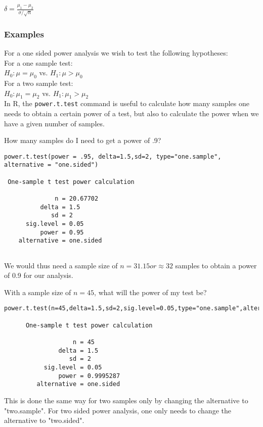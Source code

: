\documentclass[12pt,a4paper]{article}
\theoremstyle{regla}
\theoremstyle{remark}
\theoremstyle{definition}
\theoremstyle{nonumberbreak}
\begin{document}
$\delta = \frac{\mu_1-\mu_2}{\sigma/\sqrt{n}}$
\subsubsection{Examples}
\begin{xmpl}
For a one sided power analysis we wish to test the following hypotheses:\\

For a one sample test:\\
$H_0: \mu = \mu_0$ vs. $H_1: \mu > \mu_0$\\

For a two sample test:\\
$H_0: \mu_1 = \mu_2$ vs. $H_1: \mu_1 > \mu_2$\\

In R, the \texttt{power.t.test} command is useful to calculate how many samples one needs to obtain
a certain power of a test, but also to calculate the power when we have a given number of samples.
\end{xmpl}
\begin{xmpl}
How many samples do I need to get a power of .9?
\begin{lstlisting}
power.t.test(power = .95, delta=1.5,sd=2, type="one.sample", alternative = "one.sided")

 One-sample t test power calculation 

              n = 20.67702
          delta = 1.5
             sd = 2
      sig.level = 0.05
          power = 0.95
    alternative = one.sided
    
\end{lstlisting}
We would thus need a sample size of $n = 31.15 or \approx 32$ samples to obtain a power of 0.9 for
our analysis.
\end{xmpl}
\begin{xmpl}
With a sample size of $n = 45$, what will the power of my test be?

\begin{lstlisting}
power.t.test(n=45,delta=1.5,sd=2,sig.level=0.05,type="one.sample",alternative="one.sided")

      One-sample t test power calculation 
     
                   n = 45
               delta = 1.5
                  sd = 2
           sig.level = 0.05
               power = 0.9995287
         alternative = one.sided

\end{lstlisting}

This is done the same way for two samples only by changing the alternative to "two.sample". For two sided power analysis, one only needs to change the alternative to "two.sided".
\end{xmpl}
\end{document}
